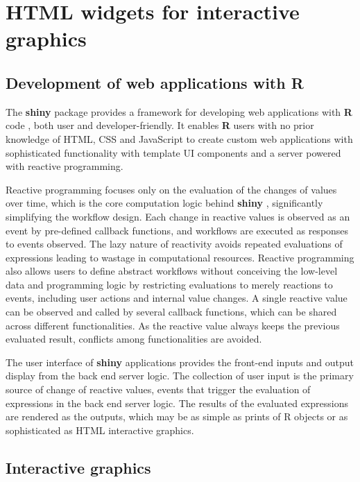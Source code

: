\documentclass{aucklandthesis}
\begin{document}
\hypertarget{html-widgets-for-interactive-graphics}{%
\section{HTML widgets for interactive graphics}\label{html-widgets-for-interactive-graphics}}

\hypertarget{sec:shiny}{%
\subsection{Development of web applications with R}\label{sec:shiny}}

The \textbf{shiny} package \autocite{shiny} provides a framework for developing web applications with \textbf{R} code \autocite{R2021}, both user and developer-friendly. It enables \textbf{R} users with no prior knowledge of HTML, CSS and JavaScript to create custom web applications with sophisticated functionality with template UI components and a server powered with reactive programming.

Reactive programming focuses only on the evaluation of the changes of values over time, which is the core computation logic behind \textbf{shiny} \autocite{mshiny}, significantly simplifying the workflow design. Each change in reactive values is observed as an event by pre-defined callback functions, and workflows are executed as responses to events observed. The lazy nature of reactivity avoids repeated evaluations of expressions leading to wastage in computational resources. Reactive programming also allows users to define abstract workflows without conceiving the low-level data and programming logic by restricting evaluations to merely reactions to events, including user actions and internal value changes. A single reactive value can be observed and called by several callback functions, which can be shared across different functionalities. As the reactive value always keeps the previous evaluated result, conflicts among functionalities are avoided.

The user interface of \textbf{shiny} applications provides the front-end inputs and output display from the back end server logic. The collection of user input is the primary source of change of reactive values, events that trigger the evaluation of expressions in the back end server logic. The results of the evaluated expressions are rendered as the outputs, which may be as simple as prints of R objects or as sophisticated as HTML interactive graphics.

\hypertarget{sec:int-graphics}{%
\subsection{Interactive graphics}\label{sec:int-graphics}}
\end{document}
